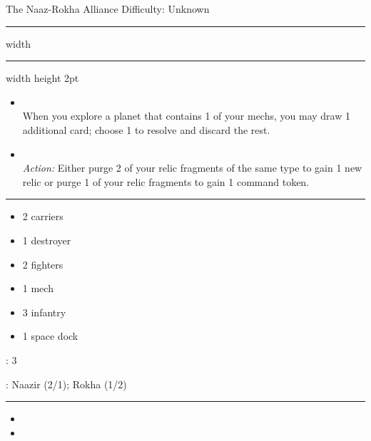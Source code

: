 \newpage
{\handel\Huge The Naaz-Rokha Alliance} \hfill {\Large Difficulty: Unknown} \vspace{-4pt}\\
\hrule width \hsize \kern 1mm \hrule width \hsize height 2pt


\begin{multicols}{2}


\begin{itemize}
\item {}\\
When you explore a planet that contains 1 of your mechs, you may draw 1 additional card; choose 1 to resolve and discard the rest.
\item {} \\
\emph{Action:} Either purge 2 of your relic fragments of the same type to gain 1 new relic or purge 1 of your relic fragments to gain 1 command token.
\end{itemize}


\vspace{-10pt}\rule{\hsize}{0.4pt}\vspace{5pt}


\vspace{-5pt}
\begin{multicols}{2}
\begin{itemize}
\item 2 carriers
\item 1 destroyer
\item 2 fighters
\item 1 mech
\item 3 infantry
\item 1 space dock
\end{itemize}
\end{multicols}

\vspace{-5pt}
: 3

\vspace{2pt}
: Naazir (2/1); Rokha (1/2)

\rule{\hsize}{0.4pt}\vspace{5pt}


\begin{itemize}
\item \psycho
\item \development
\end{itemize}


\end{multicols}
